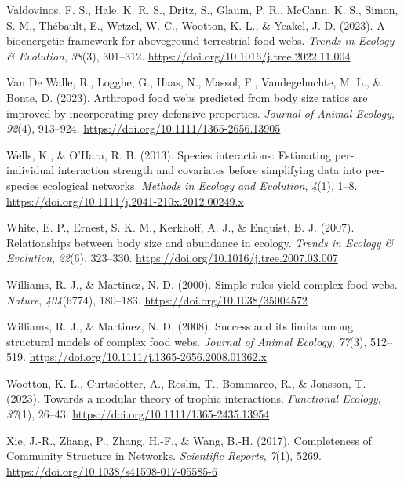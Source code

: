 \documentclass[
]{article}
\newlength{\cslhangindent}
\newenvironment{CSLReferences}[2] %
 {\begin{list}{}{%
  \setlength{\itemindent}{0pt}
  \setlength{\leftmargin}{0pt}
  \setlength{\parsep}{0pt}
  \ifodd #1
   \setlength{\leftmargin}{\cslhangindent}
   \setlength{\itemindent}{-1\cslhangindent}
  \fi
  \setlength{\itemsep}{#2\baselineskip}}}
 {\end{list}}
\begin{document}
\begin{CSLReferences}{1}{0}
Valdovinos, F. S., Hale, K. R. S., Dritz, S., Glaum, P. R., McCann, K.
S., Simon, S. M., Thébault, E., Wetzel, W. C., Wootton, K. L., \&
Yeakel, J. D. (2023). A bioenergetic framework for aboveground
terrestrial food webs. \emph{Trends in Ecology \& Evolution},
\emph{38}(3), 301--312. \url{https://doi.org/10.1016/j.tree.2022.11.004}

Van De Walle, R., Logghe, G., Haas, N., Massol, F., Vandegehuchte, M.
L., \& Bonte, D. (2023). Arthropod food webs predicted from body size
ratios are improved by incorporating prey defensive properties.
\emph{Journal of Animal Ecology}, \emph{92}(4), 913--924.
\url{https://doi.org/10.1111/1365-2656.13905}

Wells, K., \& O'Hara, R. B. (2013). Species interactions: Estimating
per-individual interaction strength and covariates before simplifying
data into per-species ecological networks. \emph{Methods in Ecology and
Evolution}, \emph{4}(1), 1--8.
\url{https://doi.org/10.1111/j.2041-210x.2012.00249.x}

White, E. P., Ernest, S. K. M., Kerkhoff, A. J., \& Enquist, B. J.
(2007). Relationships between body size and abundance in ecology.
\emph{Trends in Ecology \& Evolution}, \emph{22}(6), 323--330.
\url{https://doi.org/10.1016/j.tree.2007.03.007}

Williams, R. J., \& Martinez, N. D. (2000). Simple rules yield complex
food webs. \emph{Nature}, \emph{404}(6774), 180--183.
\url{https://doi.org/10.1038/35004572}

Williams, R. J., \& Martinez, N. D. (2008). Success and its limits among
structural models of complex food webs. \emph{Journal of Animal
Ecology}, \emph{77}(3), 512--519.
\url{https://doi.org/10.1111/j.1365-2656.2008.01362.x}

Wootton, K. L., Curtsdotter, A., Roslin, T., Bommarco, R., \& Jonsson,
T. (2023). Towards a modular theory of trophic interactions.
\emph{Functional Ecology}, \emph{37}(1), 26--43.
\url{https://doi.org/10.1111/1365-2435.13954}

Xie, J.-R., Zhang, P., Zhang, H.-F., \& Wang, B.-H. (2017). Completeness
of {Community Structure} in {Networks}. \emph{Scientific Reports},
\emph{7}(1), 5269. \url{https://doi.org/10.1038/s41598-017-05585-6}


\end{CSLReferences}
\end{document}

